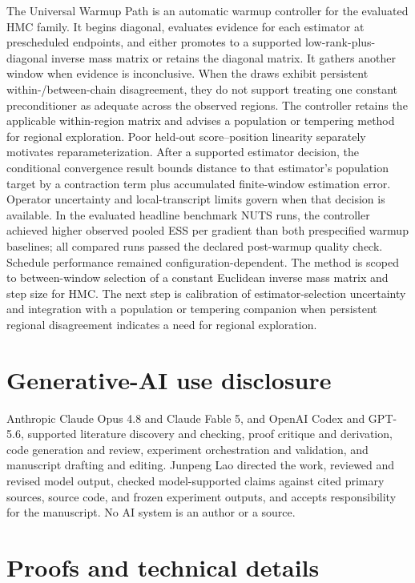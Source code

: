\documentclass[11pt]{article}
\theoremstyle{plain}
\theoremstyle{definition}
\theoremstyle{remark}
\begin{document}
The Universal Warmup Path is an automatic warmup controller for the evaluated
HMC family. It begins diagonal, evaluates evidence for each estimator at
prescheduled endpoints, and either promotes to a supported
low-rank-plus-diagonal inverse mass matrix or retains the diagonal matrix. It
gathers another window when evidence is inconclusive. When the draws exhibit
persistent within-/between-chain disagreement, they do not support treating one
constant preconditioner as adequate across the observed regions. The controller
retains the applicable within-region matrix and advises a population or
tempering method for regional exploration. Poor held-out score--position
linearity separately motivates reparameterization. After a supported estimator
decision, the conditional convergence result bounds distance to that estimator's
population target by a contraction term plus accumulated finite-window
estimation error. Operator uncertainty and
local-transcript limits govern when that decision is available. In the
evaluated headline benchmark NUTS runs, the controller achieved higher observed
pooled ESS per gradient than both prespecified warmup baselines; all compared
runs passed the declared post-warmup quality check. Schedule performance
remained configuration-dependent. The method is scoped to between-window
selection of a constant Euclidean inverse mass matrix and step size for HMC.
The next step is calibration of estimator-selection uncertainty and integration
with a population or tempering companion when persistent regional disagreement
indicates a need for regional exploration.

\section*{Generative-AI use disclosure}

Anthropic Claude Opus 4.8 and Claude Fable 5, and OpenAI Codex and GPT-5.6,
supported literature discovery and checking, proof critique and derivation,
code generation and review, experiment orchestration and validation, and
manuscript drafting and editing. Junpeng Lao directed the work, reviewed and
revised model output, checked model-supported claims against cited primary
sources, source code, and frozen experiment outputs, and accepts responsibility
for the manuscript. No AI system is an author or a source.



\appendix
\section{Proofs and technical details}\label{app:proofs}
\end{document}
